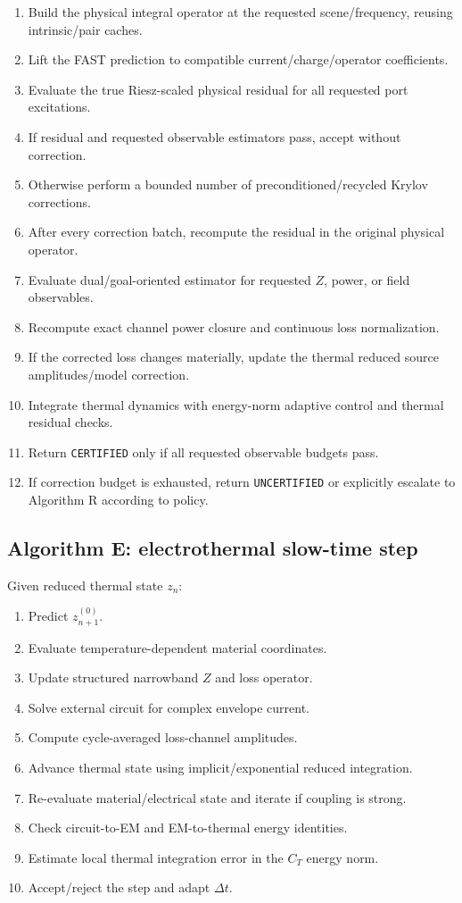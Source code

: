 \begin{enumerate}
\item Build the physical integral operator at the requested scene/frequency,
      reusing intrinsic/pair caches.
\item Lift the FAST prediction to compatible current/charge/operator
      coefficients.
\item Evaluate the true Riesz-scaled physical residual for all requested port
      excitations.
\item If residual and requested observable estimators pass, accept without
      correction.
\item Otherwise perform a bounded number of preconditioned/recycled Krylov
      corrections.
\item After every correction batch, recompute the residual in the original
      physical operator.
\item Evaluate dual/goal-oriented estimator for requested $Z$, power, or field
      observables.
\item Recompute exact channel power closure and continuous loss normalization.
\item If the corrected loss changes materially, update the thermal reduced
      source amplitudes/model correction.
\item Integrate thermal dynamics with energy-norm adaptive control and thermal
      residual checks.
\item Return \texttt{CERTIFIED} only if all requested observable budgets pass.
\item If correction budget is exhausted, return \texttt{UNCERTIFIED} or
      explicitly escalate to Algorithm R according to policy.
\end{enumerate}

\subsection{Algorithm E: electrothermal slow-time step}

Given reduced thermal state $z_n$:

\begin{enumerate}
\item Predict $z_{n+1}^{(0)}$.
\item Evaluate temperature-dependent material coordinates.
\item Update structured narrowband $Z$ and loss operator.
\item Solve external circuit for complex envelope current.
\item Compute cycle-averaged loss-channel amplitudes.
\item Advance thermal state using implicit/exponential reduced integration.
\item Re-evaluate material/electrical state and iterate if coupling is strong.
\item Check circuit-to-EM and EM-to-thermal energy identities.
\item Estimate local thermal integration error in the $C_T$ energy norm.
\item Accept/reject the step and adapt $\Delta t$.
\end{enumerate}

